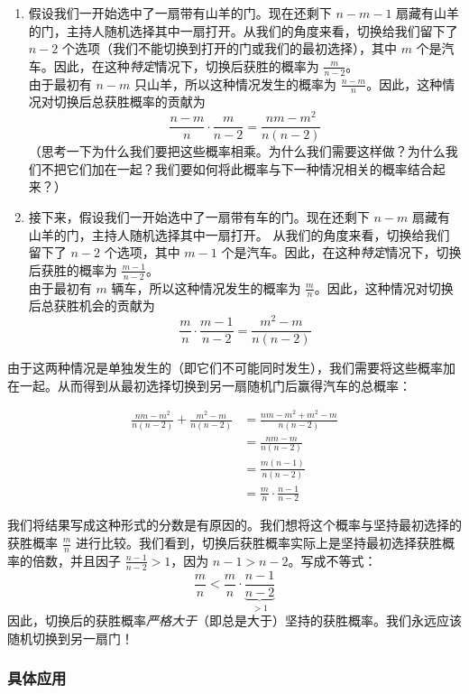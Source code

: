 \begin{enumerate}[label=(\alph*)]
    \item 假设我们一开始选中了一扇带有山羊的门。现在还剩下 $n - m - 1$ 扇藏有山羊的门，主持人随机选择其中一扇打开。从我们的角度来看，切换给我们留下了 $n-2$ 个选项（我们不能切换到打开的门或我们的最初选择），其中 $m$ 个是汽车。因此，在这种\emph{特定}情况下，切换后获胜的概率为 $\frac{m}{n-2}$。\\
    由于最初有 $n - m$ 只山羊，所以这种情况发生的概率为 $\frac{n-m}{n}$。因此，这种情况对切换后总获胜概率的贡献为
    \[\frac{n-m}{n} \cdot \frac{m}{n-2} = \frac{nm-m^2}{n(n-2)}\]
    （思考一下为什么我们要把这些概率相乘。为什么我们需要这样做？为什么我们不把它们加在一起？我们要如何将此概率与下一种情况相关的概率结合起来？）
    \item 接下来，假设我们一开始选中了一扇带有车的门。现在还剩下 $n - m$ 扇藏有山羊的门，主持人随机选择其中一扇打开。 从我们的角度来看，切换给我们留下了 $n-2$ 个选项，其中 $m - 1$ 个是汽车。因此，在这种\emph{特定}情况下，切换后获胜的概率为 $\frac{m-1}{n-2}$。\\
    由于最初有 $m$ 辆车，所以这种情况发生的概率为 $\frac{m}{n}$。因此，这种情况对切换后总获胜机会的贡献为
    \[\frac{m}{n} \cdot \frac{m-1}{n-2} = \frac{m^2-m}{n(n-2)}\]
\end{enumerate}

由于这两种情况是单独发生的（即它们不可能同时发生），我们需要将这些概率加在一起。从而得到从最初选择切换到另一扇随机门后赢得汽车的总概率：

\begin{align*}
    \frac{nm-m^2}{n(n-2)} + \frac{m^2-m}{n(n-2)} &= \frac{nm - m^2 + m^2 - m}{n(n-2)} \\
    &= \frac{nm - m}{n(n-2)} \\
    &= \frac{m(n - 1)}{n(n-2)} \\
    &= \frac{m}{n} \cdot \frac{n-1}{n-2}
\end{align*}

我们将结果写成这种形式的分数是有原因的。我们想将这个概率与坚持最初选择的获胜概率 $\frac{m}{n}$ 进行比较。我们看到，切换后获胜概率实际上是坚持最初选择获胜概率的倍数，并且因子 $\frac{n-1}{n-2} > 1$，因为 $ n - 1 > n - 2$。写成不等式：
\[\frac{m}{n} < \frac{m}{n} \cdot \underbrace{\frac{n-1}{n-2}}_{>1}\]
因此，切换后的获胜概率\emph{严格大于}（即总是大于）坚持的获胜概率。我们永远应该随机切换到另一扇门！

\subsubsection*{具体应用}

